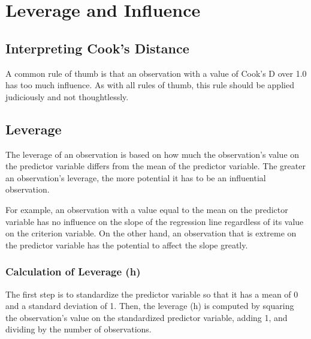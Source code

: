 \section{Leverage and Influence}


\subsection{Interpreting Cook's Distance}
A common rule of thumb is that an observation with a value of Cook's D over 1.0 has too much influence. As with all rules of thumb, this rule should be applied judiciously and not thoughtlessly.

\subsection{Leverage}
The leverage of an observation is based on how much the observation's value on the predictor variable differs from the mean of the predictor variable. The greater an observation's leverage, the more potential it has to be an influential observation. 

For example, an observation with a value equal to the mean on the predictor variable has no influence on the slope of the regression line regardless of its value on the criterion variable. On the other hand, an observation that is extreme on the predictor variable has the potential to affect the slope greatly.

\subsubsection{Calculation of Leverage (h)}
The first step is to standardize the predictor variable so that it has a mean of 0 and a standard deviation of 1. Then, the leverage (h) is computed by squaring the observation's value on the standardized predictor variable, adding 1, and dividing by the number of observations.


